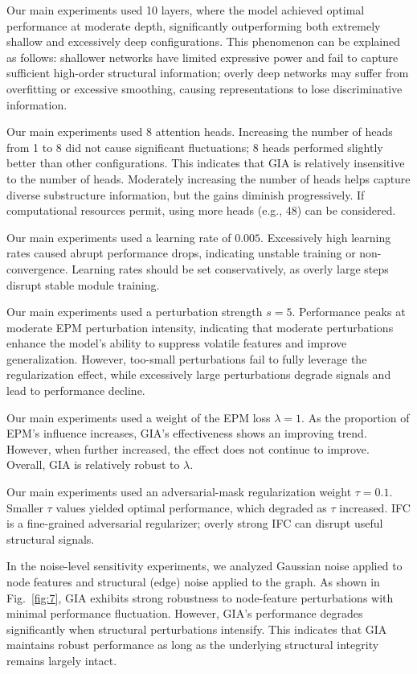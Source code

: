 \documentclass[a4paper,fleqn]{cas-dc}
\begin{document}
{\color{blue}Our main experiments used 10 layers, where the model achieved optimal performance at moderate depth, significantly outperforming both extremely shallow and excessively deep configurations. This phenomenon can be explained as follows: shallower networks have limited expressive power and fail to capture sufficient high-order structural information; overly deep networks may suffer from overfitting or excessive smoothing, causing representations to lose discriminative information.

Our main experiments used 8 attention heads. Increasing the number of heads from 1 to 8 did not cause significant fluctuations; 8 heads performed slightly better than other configurations. This indicates that GIA is relatively insensitive to the number of heads. Moderately increasing the number of heads helps capture diverse substructure information, but the gains diminish progressively. If computational resources permit, using more heads (e.g., 48) can be considered.

Our main experiments used a learning rate of \(0.005\). Excessively high learning rates caused abrupt performance drops, indicating unstable training or non-convergence. Learning rates should be set conservatively, as overly large steps disrupt stable module training.

Our main experiments used a perturbation strength \(s=5\). Performance peaks at moderate EPM perturbation intensity, indicating that moderate perturbations enhance the model's ability to suppress volatile features and improve generalization. However, too-small perturbations fail to fully leverage the regularization effect, while excessively large perturbations degrade signals and lead to performance decline.

Our main experiments used a weight of the EPM loss \(\lambda=1\). As the proportion of EPM's influence increases, GIA's effectiveness shows an improving trend. However, when further increased, the effect does not continue to improve. Overall, GIA is relatively robust to $\lambda$.




Our main experiments used an adversarial-mask regularization weight \(\tau=0.1\). Smaller \(\tau\) values yielded optimal performance, which degraded as \(\tau\) increased. IFC is a fine-grained adversarial regularizer; overly strong IFC can disrupt useful structural signals.

In the noise-level sensitivity experiments, we analyzed Gaussian noise applied to node features and structural (edge) noise applied to the graph. As shown in Fig.~\ref{fig:7}, GIA exhibits strong robustness to node-feature perturbations with minimal performance fluctuation. However, GIA's performance degrades significantly when structural perturbations intensify. This indicates that GIA maintains robust performance as long as the underlying structural integrity remains largely intact.}
\end{document}

